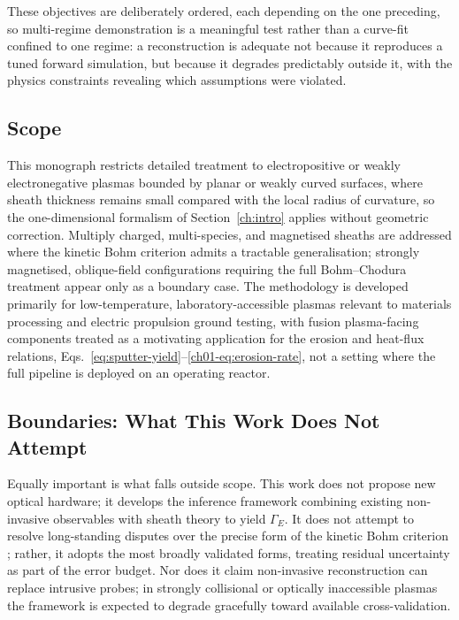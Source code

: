 These objectives are deliberately ordered, each depending on the one preceding, so multi-regime demonstration is a meaningful test rather than a curve-fit confined to one regime: a reconstruction is adequate not because it reproduces a tuned forward simulation, but because it degrades predictably outside it, with the physics constraints revealing which assumptions were violated.

\subsection{Scope}

This monograph restricts detailed treatment to electropositive or weakly electronegative plasmas bounded by planar or weakly curved surfaces, where sheath thickness remains small compared with the local radius of curvature, so the one-dimensional formalism of Section~\ref{ch:intro} applies without geometric correction. Multiply charged, multi-species, and magnetised sheaths are addressed where the kinetic Bohm criterion admits a tractable generalisation; strongly magnetised, oblique-field configurations requiring the full Bohm--Chodura treatment appear only as a boundary case. The methodology is developed primarily for low-temperature, laboratory-accessible plasmas relevant to materials processing and electric propulsion ground testing, with fusion plasma-facing components treated as a motivating application for the erosion and heat-flux relations, Eqs.~\eqref{eq:sputter-yield}--\eqref{ch01-eq:erosion-rate}, not a setting where the full pipeline is deployed on an operating reactor.

\subsection{Boundaries: What This Work Does Not Attempt}

Equally important is what falls outside scope. This work does not propose new optical hardware; it develops the inference framework combining existing non-invasive observables with sheath theory to yield $\Gamma_E$. It does not attempt to resolve long-standing disputes over the precise form of the kinetic Bohm criterion \cite{ref0015}; rather, it adopts the most broadly validated forms, treating residual uncertainty as part of the error budget. Nor does it claim non-invasive reconstruction can replace intrusive probes; in strongly collisional or optically inaccessible plasmas the framework is expected to degrade gracefully toward available cross-validation.

